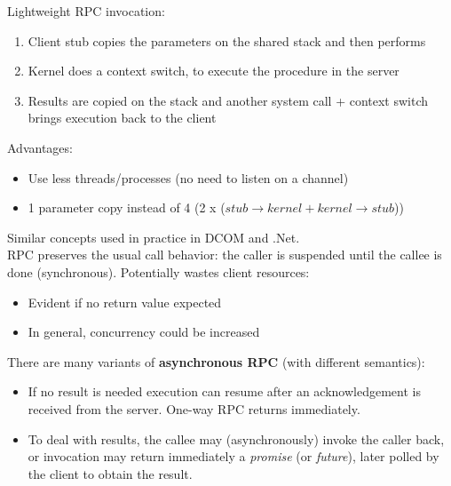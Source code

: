 \documentclass[10pt,a4paper]{article}
\begin{document}
Lightweight RPC invocation:
\begin{enumerate}
	\item Client stub copies the parameters on the shared stack and then performs
	\item Kernel does a context switch, to execute the procedure in the server
	\item Results are copied on the stack and another system call + context switch brings execution back to the client
\end{enumerate}
Advantages:
\begin{itemize}
	\item Use less threads/processes (no need to listen on a channel)
	\item 1 parameter copy instead of 4 (2 x ($stub \rightarrow kernel + kernel \rightarrow stub$))
\end{itemize}
Similar concepts used in practice in DCOM and .Net. \pagebreak \\
RPC preserves the usual call behavior: the caller is suspended until the callee is done (synchronous). Potentially wastes client resources:
\begin{itemize}
	\item Evident if no return value expected
	\item In general, concurrency could be increased
\end{itemize}
There are many variants of \textbf{asynchronous RPC} (with different semantics):
\begin{itemize}
	\item If no result is needed execution can resume after an acknowledgement is received from the server. One-way RPC returns immediately.
	\item To deal with results, the callee may (asynchronously) invoke the caller back, or invocation may return immediately a \textit{promise} (or \textit{future}), later polled by the client to obtain the result. 
\end{itemize}
\end{document}
